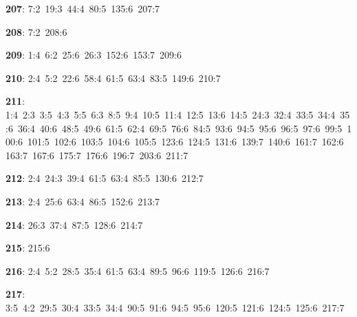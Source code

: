 \noindent \textbf{207}: 7:2\allowbreak\ 19:3\allowbreak\ 44:4\allowbreak\ 80:5\allowbreak\ 135:6\allowbreak\ 207:7\par
\noindent \textbf{208}: 7:2\allowbreak\ 208:6\par
\noindent \textbf{209}: 1:4\allowbreak\ 6:2\allowbreak\ 25:6\allowbreak\ 26:3\allowbreak\ 152:6\allowbreak\ 153:7\allowbreak\ 209:6\par
\noindent \textbf{210}: 2:4\allowbreak\ 5:2\allowbreak\ 22:6\allowbreak\ 58:4\allowbreak\ 61:5\allowbreak\ 63:4\allowbreak\ 83:5\allowbreak\ 149:6\allowbreak\ 210:7\par
\noindent \textbf{211}: 1:4\allowbreak\ 2:3\allowbreak\ 3:5\allowbreak\ 4:3\allowbreak\ 5:5\allowbreak\ 6:3\allowbreak\ 8:5\allowbreak\ 9:4\allowbreak\ 10:5\allowbreak\ 11:4\allowbreak\ 12:5\allowbreak\ 13:6\allowbreak\ 14:5\allowbreak\ 24:3\allowbreak\ 32:4\allowbreak\ 33:5\allowbreak\ 34:4\allowbreak\ 35:6\allowbreak\ 36:4\allowbreak\ 40:6\allowbreak\ 48:5\allowbreak\ 49:6\allowbreak\ 61:5\allowbreak\ 62:4\allowbreak\ 69:5\allowbreak\ 76:6\allowbreak\ 84:5\allowbreak\ 93:6\allowbreak\ 94:5\allowbreak\ 95:6\allowbreak\ 96:5\allowbreak\ 97:6\allowbreak\ 99:5\allowbreak\ 100:6\allowbreak\ 101:5\allowbreak\ 102:6\allowbreak\ 103:5\allowbreak\ 104:6\allowbreak\ 105:5\allowbreak\ 123:6\allowbreak\ 124:5\allowbreak\ 131:6\allowbreak\ 139:7\allowbreak\ 140:6\allowbreak\ 161:7\allowbreak\ 162:6\allowbreak\ 163:7\allowbreak\ 167:6\allowbreak\ 175:7\allowbreak\ 176:6\allowbreak\ 196:7\allowbreak\ 203:6\allowbreak\ 211:7\par
\noindent \textbf{212}: 2:4\allowbreak\ 24:3\allowbreak\ 39:4\allowbreak\ 61:5\allowbreak\ 63:4\allowbreak\ 85:5\allowbreak\ 130:6\allowbreak\ 212:7\par
\noindent \textbf{213}: 2:4\allowbreak\ 25:6\allowbreak\ 63:4\allowbreak\ 86:5\allowbreak\ 152:6\allowbreak\ 213:7\par
\noindent \textbf{214}: 26:3\allowbreak\ 37:4\allowbreak\ 87:5\allowbreak\ 128:6\allowbreak\ 214:7\par
\noindent \textbf{215}: 215:6\par
\noindent \textbf{216}: 2:4\allowbreak\ 5:2\allowbreak\ 28:5\allowbreak\ 35:4\allowbreak\ 61:5\allowbreak\ 63:4\allowbreak\ 89:5\allowbreak\ 96:6\allowbreak\ 119:5\allowbreak\ 126:6\allowbreak\ 216:7\par
\noindent \textbf{217}: 3:5\allowbreak\ 4:2\allowbreak\ 29:5\allowbreak\ 30:4\allowbreak\ 33:5\allowbreak\ 34:4\allowbreak\ 90:5\allowbreak\ 91:6\allowbreak\ 94:5\allowbreak\ 95:6\allowbreak\ 120:5\allowbreak\ 121:6\allowbreak\ 124:5\allowbreak\ 125:6\allowbreak\ 217:7\par
